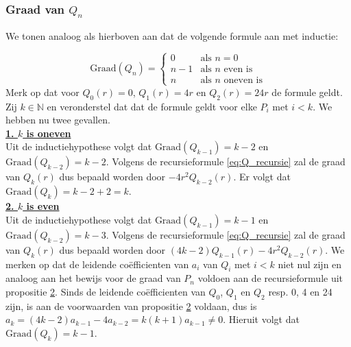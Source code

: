 \documentclass[12pt,a4paper]{article}
\theoremstyle{definition}
\numberwithin{equation}{section}
\begin{document}
\subsubsection*{Graad van $Q_n$}
We tonen analoog als hierboven aan dat de volgende formule aan met inductie: 

\begin{equation*}
\text{Graad$(Q_n)=$}
\begin{cases}
  0 & \text{als $n=0$}\\
n-1 & \text{als $n$ even is}\\
n & \text{als $n$ oneven is}
\end{cases}
\end{equation*}
Merk op dat voor $Q_0(r) = 0$, $Q_1(r) = 4r$ en  $Q_2(r)=24r$ de formule geldt.
Zij $k\in\mathbb{N}$ en veronderstel dat dat de formule geldt voor elke $P_i$ met $i<k$. We hebben nu twee gevallen.\\
%
\underline{\textbf{1. $k$ is oneven}}\\
Uit de inductiehypothese volgt dat $\text{Graad}(Q_{k-1}) = k-2$ en $\text{Graad}(Q_{k-2}) = k-2$.
Volgens de recursieformule \eqref{eq:Q_recursie} zal de graad van $Q_k(r)$ dus bepaald worden door $-4r^2Q_{k-2}(r)$. Er volgt dat $\text{Graad}(Q_k) = k-2+2 = k.$
\\
\underline{\textbf{2. $k$ is even}}\\
Uit de inductiehypothese volgt dat $\text{Graad}(Q_{k-1}) = k-1$ en $\text{Graad}(Q_{k-2}) = k-3$.
Volgens de recursieformule \eqref{eq:Q_recursie} zal de graad van $Q_k(r)$ dus bepaald worden door $(4k-2)Q_{k-1}(r)-4r^2Q_{k-2}(r)$. We merken op dat de leidende coëfficienten van $a_i$ van $Q_i$ met $i<k$  niet nul zijn en analoog aan het bewijs voor de graad van $P_n$ voldoen aan de recursieformule uit propositie \hyperref[thm:prop2]{2}.
Sinds de leidende coëfficienten van $Q_0$, $Q_1$ en $Q_2$ resp. 0, 4 en 24 zijn, is aan  de voorwaarden van propositie \hyperref[thm:prop2]{2} voldaan, dus is $a_k = (4k-2)a_{k-1} - 4a_{k-2} = k(k+1)a_{k-1} \neq 0$.
Hieruit volgt dat $\text{Graad}(Q_k) = k-1$.

\setcounter{section}{4}
\end{document}
